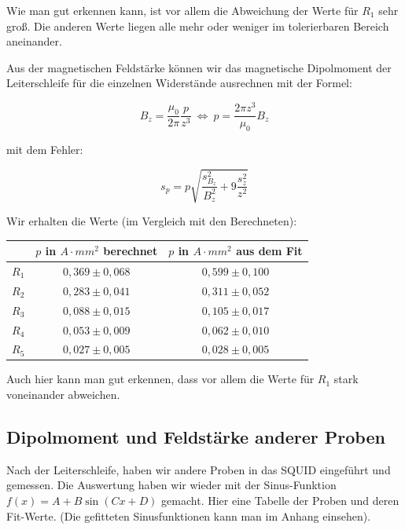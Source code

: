  Wie man gut erkennen kann, ist vor allem die Abweichung der Werte für $R_1$ sehr groß. Die anderen Werte liegen alle mehr oder weniger im tolerierbaren Bereich aneinander.
 
 Aus der magnetischen Feldstärke können wir das magnetische Dipolmoment der Leiterschleife für die einzelnen Widerstände ausrechnen mit der Formel:
 
$$ B_z = \frac{\mu_0}{2\pi}\frac{p}{z^3} \ \Leftrightarrow \  p = \frac{2\pi z^3}{\mu_0}B_z $$

mit dem Fehler:

$$s_p = p\sqrt{\frac{s_{B_z}^2}{B_z^2} + 9\frac{s_z^2}{z^2}}$$

Wir erhalten die Werte (im Vergleich mit den Berechneten):

\begin{center}
\begin{tabular}[H]{| c | c | c |} \hline
 & $p$ in $A\cdot mm^2$ berechnet & $p$ in $A\cdot mm^2$ aus dem Fit\\ \hline \hline
 $R_1$ & $0,369 \pm 0,068$ & $0,599\pm 0,100$\\
 $R_2$ & $0,283 \pm 0,041$ & $0,311\pm 0,052$\\
 $R_3$ & $0,088 \pm 0,015$ & $0,105\pm 0,017$\\
 $R_4$ & $0,053 \pm 0,009$ & $0,062\pm 0,010$\\
 $R_5$ & $0,027 \pm 0,005$ & $0,028\pm 0,005$\\ \hline
 \end{tabular}
 \end{center}
 
 Auch hier kann man gut erkennen, dass vor allem die Werte für $R_1$ stark voneinander abweichen.

\subsection{Dipolmoment und Feldstärke anderer Proben}

Nach der Leiterschleife, haben wir andere Proben in das SQUID eingeführt und gemessen. Die Auswertung haben wir wieder mit der Sinus-Funktion $f(x) = A + B\sin(Cx+D)$ gemacht. Hier eine Tabelle der Proben und deren Fit-Werte. (Die gefitteten Sinusfunktionen kann man im Anhang einsehen).

